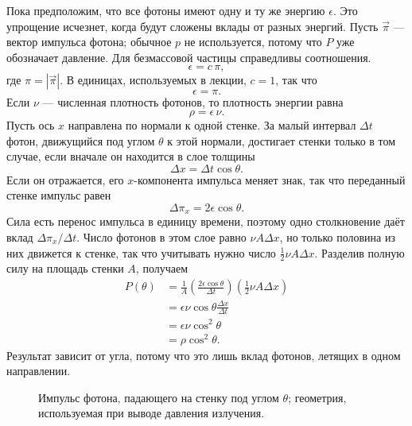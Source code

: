 Пока предположим, что все фотоны имеют одну и ту же энергию \(\epsilon\). Это упрощение исчезнет, когда будут сложены вклады от разных энергий. Пусть \(\vec{\pi}\) — вектор импульса фотона; обычное \(p\) не используется, потому что \(P\) уже обозначает давление. Для безмассовой частицы справедливы соотношения.
\begin{equation}
\epsilon=c\,\pi,
\end{equation}
где \(\pi=|\vec{\pi}|\). В единицах, используемых в лекции, \(c=1\), так что
\begin{equation}
\epsilon=\pi.
\end{equation}
Если \(\nu\) — численная плотность фотонов, то плотность энергии равна
\begin{equation}
\rho=\epsilon\,\nu.
\end{equation}
Пусть ось \(x\) направлена по нормали к одной стенке. За малый интервал \(\Delta t\) фотон, движущийся под углом \(\theta\) к этой нормали, достигает стенки только в том случае, если вначале он находится в слое толщины
\begin{equation}
\Delta x=\Delta t\cos\theta.
\end{equation}
Если он отражается, его \(x\)-компонента импульса меняет знак, так что переданный стенке импульс равен
\begin{equation}
\Delta \pi_x=2\epsilon\cos\theta.
\end{equation}
Сила есть перенос импульса в единицу времени, поэтому одно столкновение даёт вклад \(\Delta \pi_x/\Delta t\). Число фотонов в этом слое равно \(\nu A\Delta x\), но только половина из них движется к стенке, так что учитывать нужно число \(\tfrac12 \nu A\Delta x\). Разделив полную силу на площадь стенки \(A\), получаем
\begin{align}
P(\theta)
&=
\frac{1}{A}
\left(\frac{2\epsilon\cos\theta}{\Delta t}\right)
\left(\frac12 \nu A\Delta x\right) \\
&=
\epsilon\nu\cos\theta\frac{\Delta x}{\Delta t} \\
&=
\epsilon\nu\cos^2\theta \\
&=
\rho\cos^2\theta.
\end{align}
Результат зависит от угла, потому что это лишь вклад фотонов, летящих в одном направлении.

\begin{figure}[htbp]
\centering
{}
\caption{Импульс фотона, падающего на стенку под углом \(\theta\); геометрия, используемая при выводе давления излучения.}
\label{fig:c05-photon-pressure}
\end{figure}

